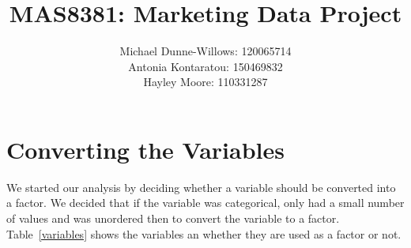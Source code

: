 \documentclass{article}
\begin{document}
\title{MAS8381: Marketing Data Project}
\author{Michael Dunne-Willows: 120065714\\
Antonia Kontaratou: 150469832\\
Hayley Moore: 110331287}
\maketitle

\section{Converting the Variables}
We started our analysis by deciding whether a variable should be converted into a factor. We decided that if the variable was categorical, only had a small number of values and was unordered then to convert the variable to a factor. Table~\ref{variables} shows the variables an whether they are used as a factor or not.
\end{document}
